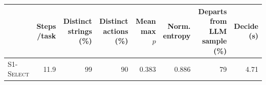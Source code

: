 \begin{tabular}{@{}lrrrrrrr@{}}\toprule
& \shortstack{Steps\\/task} & \shortstack{Distinct\\strings (\%)} & \shortstack{Distinct\\actions (\%)} & \shortstack{Mean\\max $p$} & \shortstack{Norm.\\entropy} & \shortstack{Departs from\\LLM sample (\%)} & \shortstack{Decide\\(s)} \\\midrule
\textsc{S1-Select} & 11.9 & 99 & 90 & 0.383 & 0.886 & 79 & 4.71 \\
\bottomrule\end{tabular}
